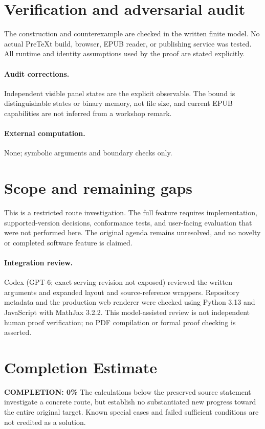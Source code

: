 \documentclass[11pt]{article}
\begin{document}
\section{Verification and adversarial audit}
The construction and counterexample are checked in the written finite model. No actual PreTeXt build, browser, EPUB reader, or publishing service was tested. All runtime and identity assumptions used by the proof are stated explicitly.
\paragraph{Audit corrections.} Independent visible panel states are the explicit observable. The bound is distinguishable states or binary memory, not file size, and current EPUB capabilities are not inferred from a workshop remark.
\paragraph{External computation.} None; symbolic arguments and boundary checks only.
\section{Scope and remaining gaps}
This is a restricted route investigation. The full feature requires implementation, supported-version decisions, conformance tests, and user-facing evaluation that were not performed here. The original agenda remains unresolved, and no novelty or completed software feature is claimed.
\paragraph{Integration review.} Codex (GPT-6; exact serving revision not exposed) reviewed the written arguments and expanded layout and source-reference wrappers. Repository metadata and the production web renderer were checked using Python 3.13 and JavaScript with MathJax 3.2.2. This model-assisted review is not independent human proof verification; no PDF compilation or formal proof checking is asserted.

\section{Completion Estimate}
\noindent\textbf{COMPLETION: 0\%}
The calculations below the preserved source statement investigate a concrete route,
but establish no substantiated new progress toward the entire original target.
Known special cases and failed sufficient conditions are not credited as a solution.
\end{document}

